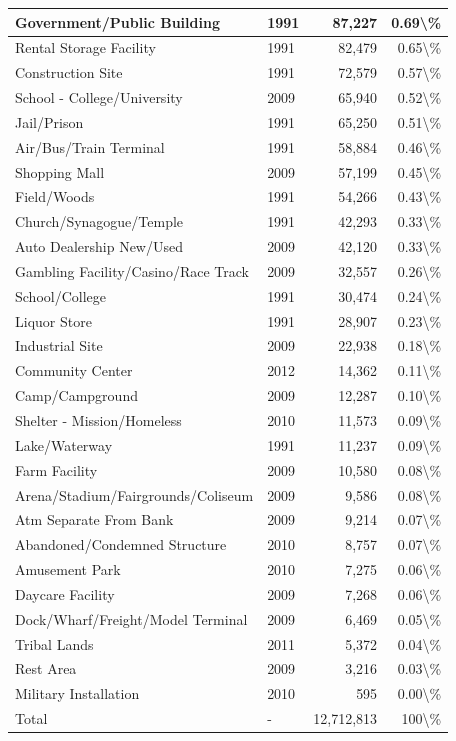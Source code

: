 \documentclass[
]{krantz}
\begin{document}
\begin{longtable}[t]{l|l|r|r}
\hline
Government/Public Building & 1991 & 87,227 & 0.69\textbackslash{}\%\\
\hline
Rental Storage Facility & 1991 & 82,479 & 0.65\textbackslash{}\%\\
\hline
Construction Site & 1991 & 72,579 & 0.57\textbackslash{}\%\\
\hline
School - College/University & 2009 & 65,940 & 0.52\textbackslash{}\%\\
\hline
Jail/Prison & 1991 & 65,250 & 0.51\textbackslash{}\%\\
\hline
Air/Bus/Train Terminal & 1991 & 58,884 & 0.46\textbackslash{}\%\\
\hline
Shopping Mall & 2009 & 57,199 & 0.45\textbackslash{}\%\\
\hline
Field/Woods & 1991 & 54,266 & 0.43\textbackslash{}\%\\
\hline
Church/Synagogue/Temple & 1991 & 42,293 & 0.33\textbackslash{}\%\\
\hline
Auto Dealership New/Used & 2009 & 42,120 & 0.33\textbackslash{}\%\\
\hline
Gambling Facility/Casino/Race Track & 2009 & 32,557 & 0.26\textbackslash{}\%\\
\hline
School/College & 1991 & 30,474 & 0.24\textbackslash{}\%\\
\hline
Liquor Store & 1991 & 28,907 & 0.23\textbackslash{}\%\\
\hline
Industrial Site & 2009 & 22,938 & 0.18\textbackslash{}\%\\
\hline
Community Center & 2012 & 14,362 & 0.11\textbackslash{}\%\\
\hline
Camp/Campground & 2009 & 12,287 & 0.10\textbackslash{}\%\\
\hline
Shelter - Mission/Homeless & 2010 & 11,573 & 0.09\textbackslash{}\%\\
\hline
Lake/Waterway & 1991 & 11,237 & 0.09\textbackslash{}\%\\
\hline
Farm Facility & 2009 & 10,580 & 0.08\textbackslash{}\%\\
\hline
Arena/Stadium/Fairgrounds/Coliseum & 2009 & 9,586 & 0.08\textbackslash{}\%\\
\hline
Atm Separate From Bank & 2009 & 9,214 & 0.07\textbackslash{}\%\\
\hline
Abandoned/Condemned Structure & 2010 & 8,757 & 0.07\textbackslash{}\%\\
\hline
Amusement Park & 2010 & 7,275 & 0.06\textbackslash{}\%\\
\hline
Daycare Facility & 2009 & 7,268 & 0.06\textbackslash{}\%\\
\hline
Dock/Wharf/Freight/Model Terminal & 2009 & 6,469 & 0.05\textbackslash{}\%\\
\hline
Tribal Lands & 2011 & 5,372 & 0.04\textbackslash{}\%\\
\hline
Rest Area & 2009 & 3,216 & 0.03\textbackslash{}\%\\
\hline
Military Installation & 2010 & 595 & 0.00\textbackslash{}\%\\
\hline
Total & - & 12,712,813 & 100\textbackslash{}\%\\
\hline
\end{longtable}
\end{document}
